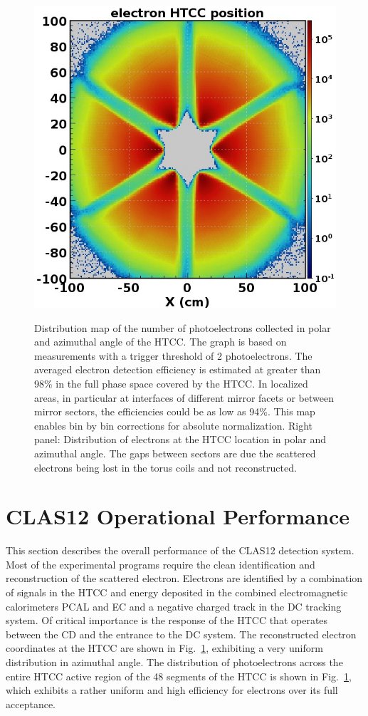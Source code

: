 \documentclass[final,3p,twocolumn]{elsarticle}
\begin{document}
\begin{figure}[t!]
{\hspace{1cm}\includegraphics[width=0.95\columnwidth]{htcc-accept.jpg}}
\caption{Distribution map of the number of photoelectrons collected in polar and azimuthal angle of the HTCC. 
The graph is based on measurements with a trigger threshold of 2 photoelectrons.
The averaged electron detection efficiency is estimated at greater than 98\% in the full phase space covered by the HTCC. 
In localized areas, in particular at interfaces of different mirror facets or between mirror sectors, the efficiencies could be as low as 
94\%. This map enables bin by bin corrections for absolute normalization. Right panel: Distribution of electrons at the HTCC 
location in polar and azimuthal angle. The gaps between sectors are
  due the scattered electrons being lost in the torus coils and not reconstructed. 
\label{htcc-performance} }

\end{figure}

\section{CLAS12 Operational Performance}

This section describes the overall performance of the CLAS12 detection system. Most of the experimental
programs require the clean identification and reconstruction of the scattered electron. Electrons are identified
by a combination of signals in the HTCC and energy deposited in the combined electromagnetic calorimeters PCAL
and EC and a negative charged track in the DC tracking system. Of critical importance is the response of the HTCC
that operates between the CD and the entrance to the DC system. The reconstructed electron coordinates at the
HTCC are shown in Fig.~\ref{htcc-performance}, exhibiting a very uniform distribution in azimuthal angle. The
distribution of photoelectrons across the entire HTCC active region of the 48 segments of the HTCC is shown
in Fig.~\ref{htcc-performance}, which exhibits a rather uniform and high efficiency for electrons over its full acceptance.
\end{document}
